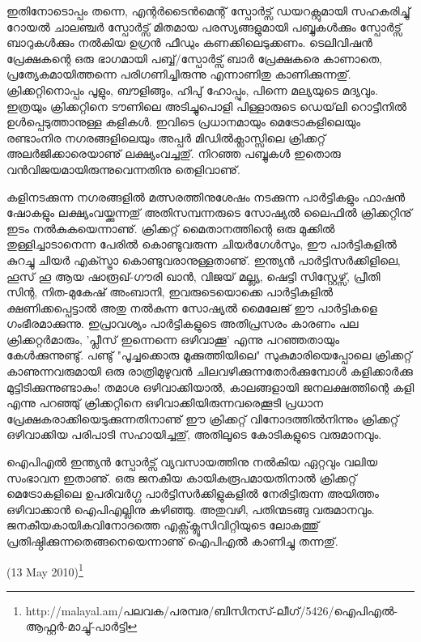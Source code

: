 ഇതിനോടൊപ്പം തന്നെ, എന്റര്‍ടൈന്‍മെന്റ് സ്പോര്‍ട്സ് ഡയറക്റ്റുമായി സഹകരിച്ചു് റോയല്‍ ചാലഞ്ചര്‍ സ്പോര്‍ട്സ് 
മിതമായ പരസ്യങ്ങളുമായി പബ്ബുകള്‍ക്കും സ്പോര്‍ട്സ് ബാറുകള്‍ക്കും നല്‍കിയ ഉഗ്രന്‍ ഫീഡും കണക്കിലെടുക്കണം. 
ടെലിവിഷന്‍ പ്രേക്ഷകന്റെ ഒരു ഭാഗമായി പബ്ബ്/സ്പോര്‍ട്സ് ബാര്‍ പ്രേക്ഷകരെ കാണാതെ, പ്രത്യേകമായിത്തന്നെ 
പരിഗണിച്ചിരുന്നു എന്നാണിതു കാണിക്കുന്നതു്. ക്രിക്കറ്റിനൊപ്പം പൂളും, ബൗളിങ്ങും, ഹിപു് ഹോപ്പും, പിന്നെ മല്യയുടെ മദ്യവും. 
ഇത്രയും ക്രിക്കറ്റിനെ ടൗണിലെ അടിച്ചുപൊളി പിള്ളാരുടെ ഡെയ്‌ലി റൊട്ടീനില്‍ ഉള്‍പ്പെടുത്താനുള്ള കളികള്‍. ഇവിടെ 
പ്രധാനമായും മെട്രോകളിലെയും രണ്ടാംനിര നഗരങ്ങളിലെയും അപ്പര്‍ മിഡില്‍ക്ലാസ്സിലെ ക്രിക്കറ്റ് അലര്‍ജിക്കാരെയാണു് 
ലക്ഷ്യംവച്ചതു്. നിറഞ്ഞ പബ്ബുകള്‍ ഇതൊരു വന്‍വിജയമായിരുന്നുവെന്നതിനു തെളിവാണു്.


കളിനടക്കുന്ന നഗരങ്ങളില്‍ മത്സരത്തിനുശേഷം നടക്കുന്ന പാര്‍ട്ടികളും ഫാഷന്‍ ഷോകളും ലക്ഷ്യംവയ്ക്കുന്നതു് അതിസമ്പന്നരുടെ 
സോഷ്യല്‍ ലൈഫില്‍ ക്രിക്കറ്റിനു് ഇടം നല്‍കുകയെന്നാണു്. ക്രിക്കറ്റ് മൈതാനത്തിന്റെ ഒരു മുക്കില്‍ 
തുള്ളിച്ചാടാനെന്ന പേരില്‍ കൊണ്ടുവരുന്ന ചിയര്‍ഗേള്‍സും, ഈ പാര്‍ട്ടികളില്‍ കുറച്ചു ചിയര്‍ എക്സ്ട്രാ കൊണ്ടുവരാനുള്ളതാണു്. 
ഇന്ത്യന്‍ പാര്‍ട്ടിസര്‍ക്കിളിലെ, ഹൂസ് ഹൂ ആയ ഷാരൂഖ്-ഗൗരി ഖാന്‍, വിജയ് മല്ല്യ, ഷെട്ടി സിസ്റ്റേഴ്സ്, പ്രീതി സിന്റ, 
നിത-മുകേഷ് അംബാനി, ഇവരുടെയൊക്കെ പാര്‍ട്ടികളില്‍ ക്ഷണിക്കപ്പെട്ടാല്‍ അതു നല്‍കുന്ന സോഷ്യല്‍ മൈലേജ് ഈ 
പാര്‍ട്ടികളെ ഗംഭീരമാക്കുന്നു. ഇപ്രാവശ്യം പാര്‍ട്ടികളുടെ അതിപ്രസരം കാരണം പല ക്രിക്കറ്റര്‍മാരും, 'പ്ലീസ് ഇന്നെന്നെ 
ഒഴിവാക്കൂ' എന്നു പറഞ്ഞതായും കേള്‍ക്കുന്നുണ്ടു്. പണ്ടു് "പൂച്ചക്കൊരു മൂക്കുത്തിയിലെ" സുകുമാരിയെപ്പോലെ ക്രിക്കറ്റ് 
കാണുന്നവരുമായി ഒരു രാത്രിമുഴുവന്‍ ചിലവഴിക്കുന്നതോര്‍ക്കുമ്പോള്‍ കളിക്കാര്‍ക്കു മുട്ടിടിക്കുന്നുണ്ടാകും! തമാശ ഒഴിവാക്കിയാല്‍, 
കാലങ്ങളായി ജനലക്ഷത്തിന്റെ കളി എന്നു പറഞ്ഞു് ക്രിക്കറ്റിനെ ഒഴിവാക്കിയിരുന്നവരെക്കൂടി പ്രധാന 
പ്രേക്ഷകരാക്കിയെടുക്കുന്നതിനാണു് ഈ ക്രിക്കറ്റ് വിനോദത്തില്‍നിന്നും ക്രിക്കറ്റ് ഒഴിവാക്കിയ പരിപാടി സഹായിച്ചതു്, 
അതിലൂടെ കോടികളുടെ വരുമാനവും.

ഐപിഎല്‍ ഇന്ത്യന്‍ സ്പോര്‍ട്സ് വ്യവസായത്തിനു നല്‍കിയ ഏറ്റവും വലിയ സംഭാവന ഇതാണു്. ഒരു ജനകീയ കായികരൂപമായതിനാല്‍ 
ക്രിക്കറ്റ് മെട്രോകളിലെ ഉപരിവര്‍ഗ്ഗ പാര്‍ട്ടിസര്‍ക്കിളുകളില്‍ നേരിട്ടിരുന്ന അയിത്തം ഒഴിവാക്കാന്‍ 
ഐപിഎല്ലിനു കഴിഞ്ഞു. അതുവഴി, പതിന്മടങ്ങു വരുമാനവും. ജനകീയകായികവിനോദത്തെ എക്സ്‌ക്ലൂസിവിറ്റിയുടെ ലോകത്തു് 
പ്രതിഷ്ഠിക്കുന്നതെങ്ങനെയെന്നാണു് ഐപിഎല്‍ കാണിച്ചു തന്നതു്.

(13 May 2010)\footnote{http://malayal.am/പലവക/പരമ്പര/ബിസിനസ്-ലീഗ്/5426/ഐപിഎല്‍-ആഫ്റ്റര്‍-മാച്ചു്-പാര്‍ട്ടി}

\newpage
